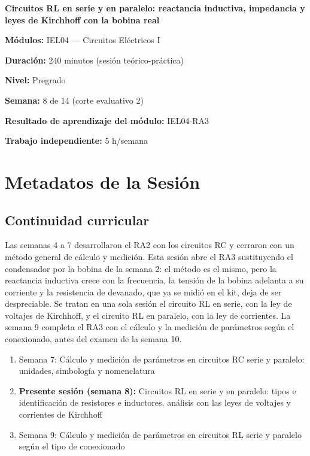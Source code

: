 \documentclass[11pt,letterpaper]{article}
\begin{document}
\begin{cabecera}
{\color{iubyellow}\Large\bfseries Circuitos RL en serie y en paralelo: reactancia inductiva, impedancia y leyes de Kirchhoff con la bobina real\par}
\vspace{0.6em}
\small
\textbf{\color{iubyellow}Módulos:} IEL04 --- Circuitos Eléctricos I\par
\textbf{\color{iubyellow}Duración:} 240 minutos (sesión teórico-práctica)\par
\textbf{\color{iubyellow}Nivel:} Pregrado\par
\textbf{\color{iubyellow}Semana:} 8 de 14 (corte evaluativo 2)\par
\textbf{\color{iubyellow}Resultado de aprendizaje del módulo:} IEL04-RA3\par
\textbf{\color{iubyellow}Trabajo independiente:} 5 h/semana\par
\end{cabecera}

\section{Metadatos de la Sesión}

\subsection{Continuidad curricular}

Las semanas 4 a 7 desarrollaron el RA2 con los circuitos RC y cerraron con un método general de cálculo y medición. Esta sesión abre el RA3 sustituyendo el condensador por la bobina de la semana 2: el método es el mismo, pero la reactancia inductiva crece con la frecuencia, la tensión de la bobina adelanta a su corriente y la resistencia de devanado, que ya se midió en el kit, deja de ser despreciable. Se tratan en una sola sesión el circuito RL en serie, con la ley de voltajes de Kirchhoff, y el circuito RL en paralelo, con la ley de corrientes. La semana 9 completa el RA3 con el cálculo y la medición de parámetros según el conexionado, antes del examen de la semana 10.

\begin{enumerate}
  \item Semana 7: Cálculo y medición de parámetros en circuitos RC serie y paralelo: unidades, simbología y nomenclatura
  \item \textbf{Presente sesión (semana 8):} Circuitos RL en serie y en paralelo: tipos e identificación de resistores e inductores, análisis con las leyes de voltajes y corrientes de Kirchhoff
  \item Semana 9: Cálculo y medición de parámetros en circuitos RL serie y paralelo según el tipo de conexionado
\end{enumerate}
\end{document}
